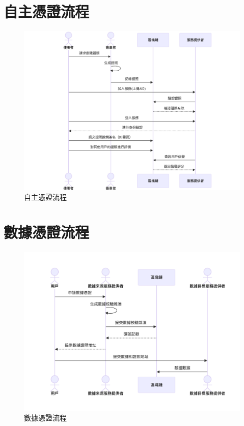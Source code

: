
\section{自主憑證流程}
\begin{figure}
  \centering
  \includegraphics[width=\linewidth]{figures/CA-UML.png}
  \caption{自主憑證流程}
\end{figure}
\section{數據憑證流程}
\begin{figure}
  \centering
  \includegraphics[width=\linewidth]{figures/DA-UML.png}
  \caption{數據憑證流程}
\end{figure}
